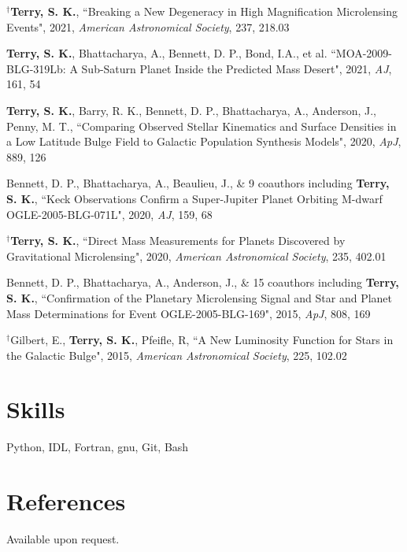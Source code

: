 \documentclass[margin,line]{res}
\begin{document}
\begin{resume}
\begin{etaremune}
\item $^{\dagger}${\bf Terry, S. K.}, ``Breaking a New Degeneracy in High Magnification Microlensing Events", 2021, \textit{American Astronomical Society}, 237, 218.03

\item \textbf{Terry, S. K.}, Bhattacharya, A., Bennett, D. P., Bond, I.A., et al. ``MOA-2009-BLG-319Lb: A Sub-Saturn Planet Inside the Predicted Mass Desert", 2021, \textit{AJ}, 161, 54

\item {\bf Terry, S. K.}, Barry, R. K., Bennett, D. P., Bhattacharya, A., Anderson, J., Penny, M. T., ``Comparing Observed Stellar Kinematics and Surface Densities in a Low Latitude Bulge Field to Galactic Population Synthesis Models", 2020, \textit{ApJ}, 889, 126

\item Bennett, D. P., Bhattacharya, A., Beaulieu, J., \& 9 coauthors including {\bf Terry, S. K.}, ``Keck Observations Confirm a Super-Jupiter Planet Orbiting M-dwarf OGLE-2005-BLG-071L", 2020, \textit{AJ}, 159, 68

\item $^{\dagger}${\bf Terry, S. K.}, ``Direct Mass Measurements for Planets Discovered by Gravitational Microlensing", 2020, \textit{American Astronomical Society}, 235, 402.01

\item Bennett, D. P., Bhattacharya, A., Anderson, J., \& 15 coauthors including {\bf Terry, S. K.}, ``Confirmation of the Planetary Microlensing Signal and Star and Planet Mass Determinations for Event OGLE-2005-BLG-169", 2015, \textit{ApJ}, 808, 169

\item $^{\dagger}$Gilbert, E., {\bf Terry, S. K.}, Pfeifle, R, ``A New Luminosity Function for Stars in the Galactic Bulge", 2015, \textit{American Astronomical Society}, 225, 102.02 \\

\end{etaremune}

\section{\sc Skills}
Python, IDL, Fortran, gnu, Git, Bash


\section{\sc References }
Available upon request.

\end{resume}
\end{document}
